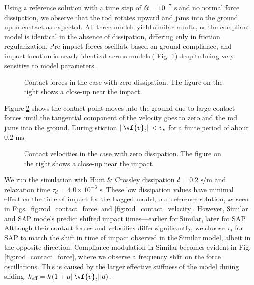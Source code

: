 Using a reference solution with a time step of $\delta t=10^{-7}\text{ s}$ and no
normal force dissipation, we observe that the rod rotates upward and jams into
the ground upon contact as expected. All three models yield similar results, as
the compliant model is identical in the absence of dissipation, differing only
in friction regularization. Pre-impact forces oscillate based on ground
compliance, and impact location is nearly identical across models (
Fig. \ref{fig:rod_contact_force_no_diss}) despite being very sensitive to model
parameters.

\begin{figure}[!h]
    \centering
    \caption{\label{fig:rod_contact_force_no_diss} Contact forces in the case with zero
    dissipation. The figure on the right shows a close-up near the impact.}
\end{figure}

Figure \ref{fig:rod_contact_velocity_no_diss} shows the contact point moves
into the ground due to large contact forces until the tangential component of
the velocity goes to zero and the rod jams into the ground. During stiction
$\Vert\vf{v}_t\Vert<v_s$ for a finite period of about $0.2\text{ ms}$.

\begin{figure}[!h]
    \centering
    \caption{\label{fig:rod_contact_velocity_no_diss} Contact velocities in the case with zero
    dissipation. The figure on the right shows a close-up near the impact.}
\end{figure}

We run the simulation with Hunt \& Crossley dissipation $d=0.2\text{ s}/\text{m}$
and relaxation time $\tau_d = 4.0\times{10}^{-6}\text{ s}$. These low
dissipation values have minimal effect on the time of impact for the Lagged model,
our reference solution, as seen in Figs. \ref{fig:rod_contact_force} and
\ref{fig:rod_contact_velocity}. However, Similar and SAP models predict shifted
impact times—earlier for Similar, later for SAP. Although their contact forces and
velocities differ significantly, we choose $\tau_d$ for SAP to match the shift in time
of impact observed in the Similar model, albeit in the opposite direction.
Compliance modulation in Similar becomes evident in Fig.
\ref{fig:rod_contact_force}, where we observe a frequency shift on the force
oscillations. This is caused by the larger effective stiffness of the model
during sliding, $k_\text{eff}=k\,(1+\mu\Vert\vf{v}_t\Vert\,d)$.

